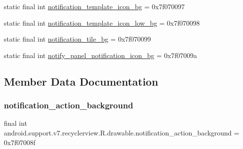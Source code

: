 \begin{DoxyCompactItemize}
\item 
static final int \mbox{\hyperlink{classandroid_1_1support_1_1v7_1_1recyclerview_1_1R_1_1drawable_a309b0025cdcb1c55708e4b85495cbc89}{notification\+\_\+template\+\_\+icon\+\_\+bg}} = 0x7f070097
\item 
static final int \mbox{\hyperlink{classandroid_1_1support_1_1v7_1_1recyclerview_1_1R_1_1drawable_a48c70131cea06dedb4af85e7ec783ed5}{notification\+\_\+template\+\_\+icon\+\_\+low\+\_\+bg}} = 0x7f070098
\item 
static final int \mbox{\hyperlink{classandroid_1_1support_1_1v7_1_1recyclerview_1_1R_1_1drawable_ab1a5b89b74498f702bf36c86091b1865}{notification\+\_\+tile\+\_\+bg}} = 0x7f070099
\item 
static final int \mbox{\hyperlink{classandroid_1_1support_1_1v7_1_1recyclerview_1_1R_1_1drawable_a74df627da5b232a7f838aa3fa672c043}{notify\+\_\+panel\+\_\+notification\+\_\+icon\+\_\+bg}} = 0x7f07009a
\end{DoxyCompactItemize}


\subsection{Member Data Documentation}
\mbox{\label{classandroid_1_1support_1_1v7_1_1recyclerview_1_1R_1_1drawable_a94ca1a9850cea62dab00fb3505930a59}} 
\subsubsection{\texorpdfstring{notification\+\_\+action\+\_\+background}{notification\_action\_background}}
{\footnotesize\ttfamily final int android.\+support.\+v7.\+recyclerview.\+R.\+drawable.\+notification\+\_\+action\+\_\+background = 0x7f07008f\hspace{0.3cm}{\ttfamily [static]}}

\mbox{\label{classandroid_1_1support_1_1v7_1_1recyclerview_1_1R_1_1drawable_a0bf2ac43c54dd606778a2e103013605f}} 
